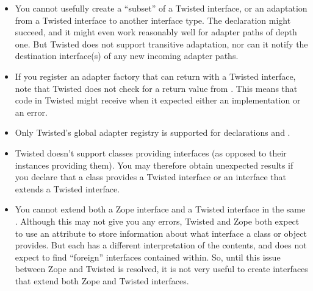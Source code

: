 \begin{verbatim%
}
\begin{verbatim%
}
\begin{verbatim%
}
\begin{verbatim%
}
\begin{verbatim%
}
\begin{verbatim%
}
\begin{itemize}
\item You cannot usefully create a ``subset'' of a Twisted interface, or an
adaptation from a Twisted interface to another interface type.  The
declaration might succeed, and it might even work reasonably well for
adapter paths of depth one.  But Twisted does not support transitive adaptation,
nor can it notify the destination interface(s) of any new incoming adapter
paths.

\item If you register an adapter factory that can return  with
a Twisted interface, note that Twisted does not check for a  return
value from .  This means that code in Twisted might
receive  when it expected either an implementation or an error.

\item Only Twisted's global adapter registry is supported for declarations and
.

\item Twisted doesn't support classes providing interfaces (as opposed to their
instances providing them).  You may therefore obtain unexpected results if you
declare that a class provides a Twisted interface or an interface that extends a
Twisted interface.







\item You cannot extend both a Zope interface and a Twisted interface in the
same .  Although this may not give you any errors,
Twisted and Zope both expect to use an  attribute to
store information about what interface a class or object provides.  But each has
a different interpretation of the contents, and does not expect to find
``foreign'' interfaces contained within.  So, until this issue between Zope and
Twisted is resolved, it is not very useful to create interfaces that extend
both Zope and Twisted interfaces.

\end{itemize}
































\end{verbatim%
}
\end{verbatim%
}
\end{verbatim%
}
\end{verbatim%
}
\end{verbatim%
}
\end{verbatim%
}
